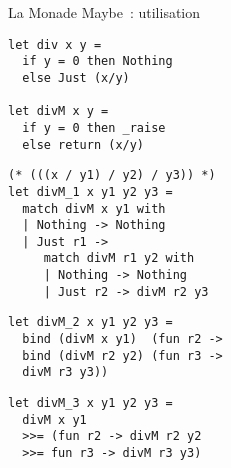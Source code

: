 \documentclass[10pt]{beamer}
\begin{document}
\begin{frame}[fragile]{La Monade Maybe~: utilisation}
  \begin{minipage}[c]{0.45\linewidth}
    \begin{verbatim}
let div x y =
  if y = 0 then Nothing
  else Just (x/y)

let divM x y =
  if y = 0 then _raise
  else return (x/y)
    \end{verbatim}
    \pause{}
    \begin{verbatim}
(* (((x / y1) / y2) / y3)) *)
let divM_1 x y1 y2 y3 =
  match divM x y1 with
  | Nothing -> Nothing
  | Just r1 ->
     match divM r1 y2 with
     | Nothing -> Nothing
     | Just r2 -> divM r2 y3
\end{verbatim}
  \end{minipage}
  \hfill
  \begin{minipage}[c]{0.45\linewidth}
    \pause{}
    \begin{verbatim}
let divM_2 x y1 y2 y3 =
  bind (divM x y1)  (fun r2 ->
  bind (divM r2 y2) (fun r3 ->
  divM r3 y3))
    \end{verbatim}
    \pause{}
    \begin{verbatim}
let divM_3 x y1 y2 y3 =
  divM x y1
  >>= (fun r2 -> divM r2 y2
  >>= fun r3 -> divM r3 y3)
    \end{verbatim}
  \end{minipage}
\end{frame}
\end{document}
